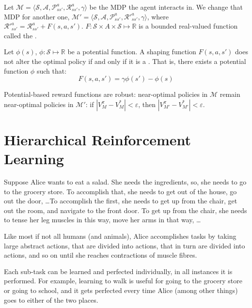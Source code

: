 Let $\mathcal{M} = \langle \mathcal{S}, \mathcal{A},
\mathcal{P}^a_{ss'}, \mathcal{R}^a_{ss'}, \gamma \rangle$ be the \ac{MDP} the
agent interacts in. We change that \ac{MDP} for another one, $\mathcal{M}' = \langle
\mathcal{S}, \mathcal{A}, \mathcal{P}^a_{ss'}, \mathcal{R}'^a_{ss'}, \gamma
\rangle$, where $\mathcal{R}'^a_{ss'} = \mathcal{R}^a_{ss'} + F(s, a, s')$.
$F : \mathcal{S} \times A \times \mathcal{S} \mapsto \mathbb{R}$ is a bounded
real-valued function called the .

Let $\phi(s)$, $\phi : \mathcal{S} \mapsto \mathbb{R}$ be a potential function.
A shaping function $F(s, a, s')$ does not alter the optimal policy if and only
if it is a . That is, there exists a
potential function $\phi$ such that:
\begin{equation}
  F(s, a, s') = \gamma \phi(s') - \phi(s)
  \label{eq:shaping-reward}
\end{equation}

Potential-based reward functions are robust: near-optimal policies
in $\mathcal{M}$ remain near-optimal policies in $\mathcal{M'}$: if $\left|
V^\pi_M - V^*_M \right| < \varepsilon$, then $\left| V^\pi_{M'} - V^*_{M'}
\right| < \varepsilon$.

\section{Hierarchical Reinforcement Learning\label{sec:hierarchical-rl}}

Suppose Alice wants to eat a salad. She needs the ingredients, so, she needs to
go to the grocery store. To accomplish that, she needs to get out of the house,
go out the door, \dots To accomplish the first, she needs to get up from the
chair, get out the room, and navigate to the front door. To get up from the
chair, she needs to tense her leg muscles in this way, move her arms in that
way, \dots

Like most if not all humans (and animals), Alice accomplishes tasks by taking
large abstract actions, that are divided into actions, that in turn are divided
into actions, and so on until she reaches contractions of muscle fibres.

Each sub-task can be learned and perfected individually, in all instances it is
performed. For example, learning to walk is useful for going to the grocery
store or going to school, and it gets perfected every time Alice (among other
things) goes to either of the two places.

